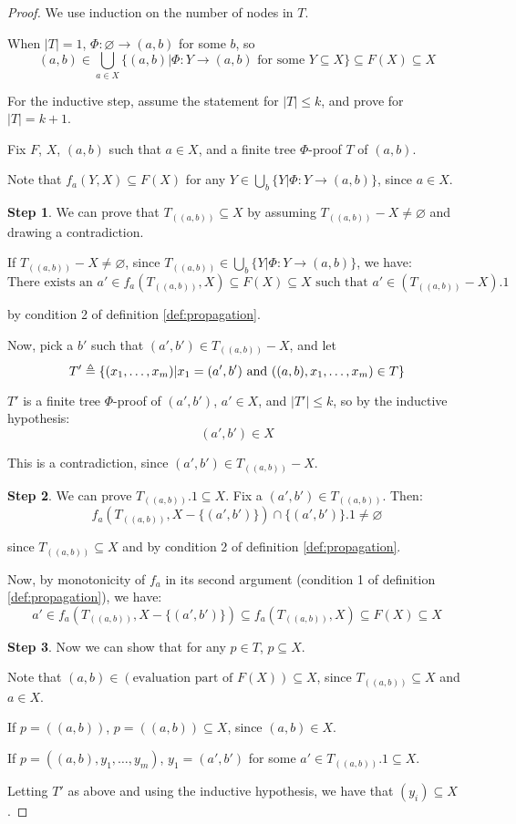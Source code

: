 \documentclass[12pt]{article}
\begin{document}
\begin{proof}
	We use induction on the number of nodes in $T$.

	When $|T|=1$, $\Phi:\varnothing\rightarrow (a,b)$ for some $b$, so
	\[(a,b)\in\bigcup_{a\in X}\{(a,b)|\Phi:Y\rightarrow (a,b)\text{ for some }Y\subseteq X\}\subseteq F(X)\subseteq X\]

	For the inductive step, assume the statement for $|T|\le k$, and prove for $|T|=k+1$.

	Fix $F$, $X$, $(a,b)$ such that $a\in X$, and a finite tree $\Phi$-proof $T$ of $(a,b)$.

	Note that $f_a(Y,X)\subseteq F(X)$ for any $Y\in\bigcup_{b}\{Y|\Phi:Y\rightarrow(a,b)\}$, since $a\in X$.

	\noindent\textbf{Step 1}. We can prove that $T_{((a,b))}\subseteq X$ by assuming $T_{((a,b))}-X\neq\varnothing$ and drawing a contradiction.

	If $T_{((a,b))}-X\neq\varnothing$, since $T_{((a,b))}\in\bigcup_b\{Y|\Phi:Y\rightarrow (a,b)\}$, we have:
	\[\text{There exists an }a'\in f_a(T_{((a,b))},X)\subseteq F(X)\subseteq X\text{ such that }a'\in(T_{((a,b))}-X).1\]

	by condition 2 of definition \ref{def:propagation}.

	Now, pick a $b'$ such that $(a',b')\in T_{((a,b))}-X$, and let
	\[T'\triangleq\{(x_1,\dots,x_m)|x_1=(a',b')\text{ and }((a,b),x_1,\dots,x_m)\in T\}\]

	$T'$ is a finite tree $\Phi$-proof of $(a',b')$, $a'\in X$, and $|T'|\le k$, so by the inductive hypothesis:
	\[(a',b')\in X\]

	This is a contradiction, since $(a',b')\in T_{((a,b))}-X$.

	\noindent\textbf{Step 2}. We can prove $T_{((a,b))}.1\subseteq X$. Fix a $(a',b')\in T_{((a,b))}$. Then:
	\[f_a(T_{((a,b))},X-\{(a',b')\})\cap\{(a',b')\}.1\neq\varnothing\]

	since $T_{((a,b))}\subseteq X$ and by condition 2 of definition \ref{def:propagation}.

	Now, by monotonicity of $f_a$ in its second argument (condition 1 of definition \ref{def:propagation}), we have:
	\[a'\in f_a(T_{((a,b))},X-\{(a',b')\})\subseteq f_a(T_{((a,b))},X)\subseteq F(X)\subseteq X\]

	\noindent\textbf{Step 3}. Now we can show that for any $p\in T$, $p\subseteq X$.

	Note that $(a,b)\in(\text{evaluation part of }F(X))\subseteq X$, since $T_{((a,b))}\subseteq X$ and $a\in X$.

	If $p=((a,b))$, $p=((a,b))\subseteq X$, since $(a,b)\in X$.

	If $p=((a,b),y_1,\dots,y_m)$, $y_1=(a',b')$ for some $a'\in T_{((a,b))}.1\subseteq X$.

	Letting $T'$ as above and using the inductive hypothesis, we have that $(y_i)\subseteq X$.
\end{proof}
\end{document}
